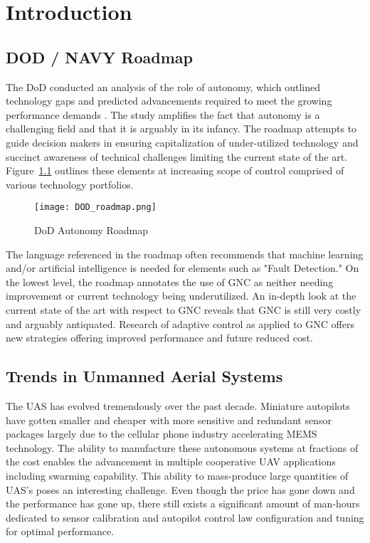 \chapter{Introduction}\label{ch:intro}

\section{DOD / NAVY Roadmap}
The \ac{DoD} conducted an analysis of the role of autonomy, which outlined technology gaps and predicted advancements required to meet the growing performance demands \cite{dodroadmap}.  The study amplifies the fact that autonomy is a challenging field and that it is arguably in its infancy.  The roadmap attempts to guide decision makers in ensuring capitalization of under-utilized technology and succinct awareness of technical challenges limiting the current state of the art.  Figure~\ref{fig:dod_roadmap} outlines these elements at increasing scope of control comprised of various technology portfolios.  
\begin{figure}[h!]
 \centering
  \texttt{[image: DOD\_roadmap.png]}
  \caption{DoD Autonomy Roadmap \cite{dodroadmap}}
  \label{fig:dod_roadmap}
\end{figure}
The language referenced in the roadmap often recommends that machine learning and/or artificial intelligence is needed for elements such as "Fault Detection."  On the lowest level, the roadmap annotates the use of \ac{GNC} as neither needing improvement or current technology being underutilized.  An in-depth look at the current state of the art with respect to \ac{GNC} reveals that \ac{GNC} is still very costly and arguably antiquated.  Research of adaptive control as applied to \ac{GNC} offers new strategies offering improved performance and future reduced cost.

\section{Trends in Unmanned Aerial Systems}
The \ac{UAS} has evolved tremendously over the past decade.  Miniature autopilots have gotten smaller and cheaper with more sensitive and redundant sensor packages largely due to the cellular phone industry accelerating \ac{MEMS} technology.  The ability to manufacture these autonomous systems at fractions of the cost enables the advancement in multiple cooperative UAV applications including swarming capability.  This ability to mass-produce large quantities of \ac{UAS}'s poses an interesting challenge.  Even though the price has gone down and the performance has gone up, there still exists a significant amount of man-hours dedicated to sensor calibration and autopilot control law configuration and tuning for optimal performance.  

